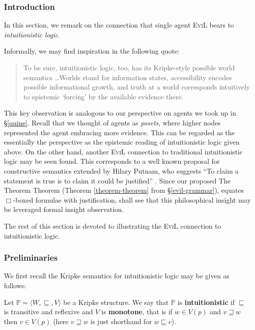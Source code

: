 \subsubsection{Introduction}
In this section, we remark on the connection that single agent \textsc{EviL} bears
to \emph{intuitionistic logic}.

Informally, we may find inspiration in the following quote:
\begin{quote}
To be sure, intuitionistic logic, too, has its Kripke-style possible
world semantics \ldots Worlds stand for information states,
accessibility encodes possible informational growth, and truth at a
world corresponds intuitively to epistemic `forcing' by the available
evidence there.
\cite{van_benthem_reflectionsepistemic_1991}
\end{quote}

This key observation is analogous to our perspective on agents we took
up in \S\ref{quine}.  Recall that we thought of agents as
\emph{posets}, where higher nodes represented the agent embracing more 
evidence.  This can be regarded as the essentially the perspective as
the epistemic reading of intuitionistic logic given above.  On the
other hand, another \textsc{EviL} connection to traditional
intuitionistic logic may be seen found. This corresponds to a
well known proposal for constructive semantics extended by Hilary
Putnam, who suggests ``To claim a statement is true is to claim it
could be justified'' \cite{putnam_problem_1981}.  
Since our proposed The Theorem Theorem (Theorem
\ref{theorem-theorem} from \S\ref{evil-grammar}), equates $\Box$-boxed
formulae with justification, shall see that this philosophical insight
may be leveraged formal insight observation.

The rest of this section is devoted to illustrating the \textsc{EviL}
connection to intuitionistic logic.

\subsubsection{Preliminaries}

We first recall the Kripke semantics for intuitionistic logic may be given
as follows:

\begin{definition}
Let $\mathbb{P} = \langle W, \sqsubseteq, V\rangle$ be a Kripke
structure.  We say that $\mathbb{P}$ is \textbf{intuitionistic} if
$\sqsubseteq$ is transitive and reflexive and $V$ is \textbf{monotone}, that is
if $w \in V(p)$ and $v \sqsupseteq w$ then $v \in V(p)$ (here $v
\sqsupseteq w$ is just shorthand for $w \sqsubseteq v$).
\end{definition}

